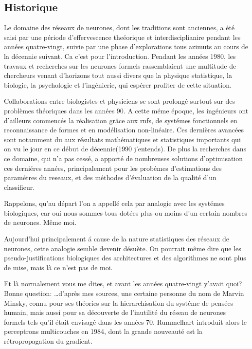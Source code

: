 \subsection{Historique}
Le domaine des r\'eseaux de neurones, dont les traditions sont
anciennes, a \'et\'e saisi par une p\'eriode d'effervescence
the\'eorique et interdisciplianire pendant les ann\'ees quatre-vingt,
suivie par une phase d'explorations tous azimuts au cours de la
d\'ecennie suivant. Ca c'est pour l'introduction.
Pendant les ann\'ees 1980, les travaux et recherches sur les neurones
formels rassemblaient une multitude de chercheurs venant d'horizons
tout aussi divers que la physique statistique, la biologie,
la psychologie et l'ing\'enierie, qui esp\'erer profiter de cette
situation.

Collaborations entre biologistes et physiciens se sont prolong\'e
surtout sur des probl\`emes th\'eoriques dans les ann\'ees 90. A cette
m\'eme \'epoque, les ing\'enieurs ont d'ailleurs commenc\'es la
r\'ealisation gr\^ace aux rnfs, de syst\'emes fonctionnels en
reconnaissance de formes et en mod\'elisation non-lin\'eaire.
Ces derni\`eres avanc\'ees sont notamment du aux r\'esultats
math\'ematiques et statistiques importants qui on vu le jour en ce
d\'ebut de d\'ecennie(1990 j'entends). De plus la
recherches dans ce domaine, qui n'a pas cess\'e, a apport\'e de nombreuses solutions
d'optimisation ces derni\'eres ann\'ees, principalement pour les
prob\'emes d'estimations des param\'etres du reseaux, et des
m\'ethodes d'\'evaluation de la qualit\'e d'un classifieur.

Rappelons, qu'au d\'epart l'on a appell\'e cela par analogie avec les
syst\'emes biologiques, car oui nous sommes tous dot\'ees plus ou
moins d'un certain nombres de neurones. M\^eme moi.

Aujourd'hui principalement \'a cause de la nature statistiques des
r\'eseaux de neurones, cette analogie semble devenir d\'esu\`ete.
On pourrait m\^eme dire que les pseudo-justifications biologiques des
architectures et des algorithmes ne sont plus de mise, mais l\`a ce
n'est pas de moi.

Et l\`a normalement vous me dites, et avant les ann\'ees quatre-vingt
y'avait quoi? Bonne question: \dots d'apr\`es mes sources, une certaine
personne du nom de Marvin Minsky, connu pour ses th\'eories sur la
hierarchisation du syst\'eme de pens\'ees humain, mais aussi pour sa
d\'ecouverte de l'inutilit\'e du r\'eseau de neurones formels tels
qu'il \'etait envisag\'e dans les ann\'ees 70. Rummelhart introduit
alors le perceptrons multicouches en 1984, dont la grande nouveaut\'e
est la r\'etropropagation du gradient.

